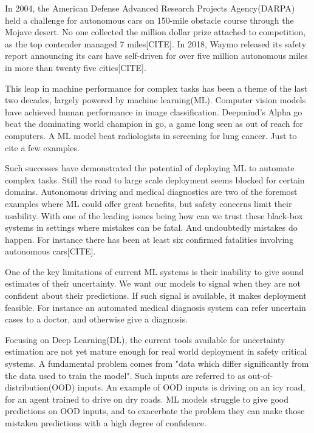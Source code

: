 \documentclass[../main.tex]{subfiles}
\begin{document}
In 2004, the American Defense Advanced Research Projects Agency(DARPA) held a challenge for autonomous cars on 150-mile obstacle course through the Mojave desert. No one collected the million dollar prize attached to competition, as the top contender managed 7 miles[CITE]. In 2018, Waymo released its safety report announcing its cars have self-driven for over five million autonomous miles in more than twenty five cities[CITE].  

This leap in machine performance for complex tasks has been a theme of the last two decades, largely powered by machine learning(ML). Computer vision models have achieved human performance in image classification.  
Deepmind's Alpha go beat the dominating world champion in go, a game long seen as out of reach for computers. A ML model beat radiologists in screening for lung cancer\citep{ardila2019end}. 
Just to cite a few examples.  

Such successes have demonstrated the potential of deploying ML to automate complex tasks. Still the road to large scale deployment seems blocked for certain domains. Autonomous driving and medical diagnostics are two of the foremost examples where ML could offer great benefits, but safety concerns limit their usability. With one of the leading issues being how can we trust these black-box systems in settings where mistakes can be fatal. And undoubtedly mistakes do happen. For instance there has been at least six confirmed fatalities involving autonomous cars[CITE]. 

One of the key limitations of current ML systems is their inability to give sound estimates of their uncertainty. 
We want our models to signal when they are not confident about their predictions. If such signal is available, it makes deployment feasible. For instance an automated medical diagnosis system can refer uncertain cases to a doctor, and otherwise give a diagnosis. 

Focusing on Deep Learning(DL)\citep{goodfellow2016deep}, the current tools available for uncertainty estimation are not yet mature enough for real world deployment in safety critical systems. A fundamental problem comes from "data which differ significantly from the data used to train the model"\citep{bishop1994novelty}. Such inputs are referred to as out-of-distribution(OOD) inputs. An example of OOD inputs is driving on an icy road, for an agent trained to drive on dry roads. 
ML models struggle to give good predictions on OOD inputs, and to exacerbate the problem they can make those mistaken predictions with a high degree of confidence.   
\end{document}
